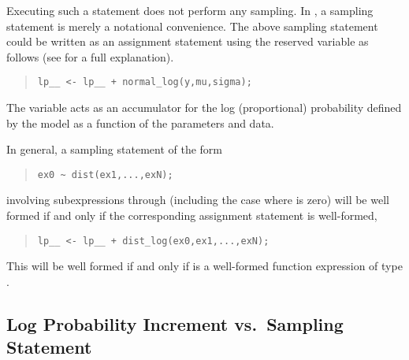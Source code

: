 Executing such a statement does not perform any sampling.  In \Stan, a
sampling statement is merely a notational convenience.  The above
sampling statement could be written as an assignment statement using
the reserved variable  as follows (see
 for a full explanation).
%
\begin{quote}
\begin{Verbatim}[fontsize=\small]
lp__ <- lp__ + normal_log(y,mu,sigma);
\end{Verbatim}
\end{quote}
%

The variable  acts as an accumulator for the log
(proportional) probability defined by the model as a function of the
parameters and data.

In general, a sampling statement of the form
%
\begin{quote}
\begin{Verbatim}[fontsize=\small]
ex0 ~ dist(ex1,...,exN);
\end{Verbatim}
\end{quote}
%
involving subexpressions  through  (including the
case where  is zero) will be well formed if and only if the
corresponding assignment statement is well-formed,
%
\begin{quote}
\begin{Verbatim}[fontsize=\small]
lp__ <- lp__ + dist_log(ex0,ex1,...,exN);
\end{Verbatim}
\end{quote}
%
This will be well formed if and only if
 is a well-formed function expression
of type .

\subsection{Log Probability Increment vs.\ Sampling Statement}\label{incr-vs-sample.section}

